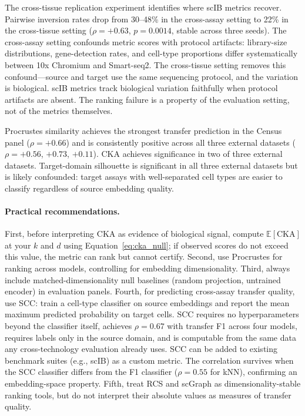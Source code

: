 \documentclass[11pt]{article}
\begin{document}
The cross-tissue replication experiment identifies where scIB metrics
recover. Pairwise inversion rates drop from 30--48\% in the cross-assay
setting to 22\% in the cross-tissue setting ($\rho = +0.63$,
$p = 0.0014$, stable across three seeds). The cross-assay setting
confounds metric scores with protocol artifacts: library-size
distributions, gene-detection rates, and cell-type proportions differ
systematically between 10x Chromium and Smart-seq2. The cross-tissue
setting removes this confound---source and target use the same
sequencing protocol, and the variation is biological. scIB metrics track
biological variation faithfully when protocol artifacts are absent. The
ranking failure is a property of the evaluation setting, not of the
metrics themselves.

Procrustes similarity achieves the strongest transfer prediction in the
Census panel ($\rho = +0.66$) and is consistently positive across all
three external datasets ($\rho = +0.56$, $+0.73$, $+0.11$). CKA
achieves significance in two of three external datasets. Target-domain
silhouette is significant in all three external datasets but is likely
confounded: target assays with well-separated cell types are easier to
classify regardless of source embedding quality.

\paragraph{Practical recommendations.} First, before interpreting CKA as
evidence of biological signal, compute $\mathbb{E}[\mathrm{CKA}]$ at
your $k$ and $d$ using Equation~\ref{eq:cka_null}; if observed scores do
not exceed this value, the metric can rank but cannot certify. Second,
use Procrustes for ranking across models, controlling for
embedding dimensionality. Third, always include matched-dimensionality
null baselines (random projection, untrained encoder) in evaluation
panels. Fourth, for predicting cross-assay transfer quality, use SCC:
train a cell-type classifier on source embeddings and report the mean
maximum predicted probability on target cells. SCC requires no
hyperparameters beyond the classifier itself, achieves $\rho = 0.67$
with transfer F1 across four models, requires labels only in the
source domain, and is computable from the same data any
cross-technology evaluation already uses. SCC can be added to existing benchmark suites (e.g., scIB) as a
custom metric. The correlation survives
when the SCC classifier differs from the F1 classifier ($\rho = 0.55$
for kNN), confirming an embedding-space property. Fifth, treat RCS and scGraph
as dimensionality-stable ranking tools, but do not interpret their
absolute values as measures of transfer quality.
\end{document}

